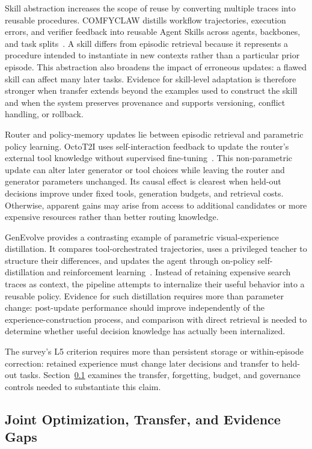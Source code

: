 Skill abstraction increases the scope of reuse by converting multiple traces into reusable procedures. COMFYCLAW distills workflow trajectories, execution errors, and verifier feedback into reusable Agent Skills across agents, backbones, and task splits~\cite{avg260701709}. A skill differs from episodic retrieval because it represents a procedure intended to instantiate in new contexts rather than a particular prior episode. This abstraction also broadens the impact of erroneous updates: a flawed skill can affect many later tasks. Evidence for skill-level adaptation is therefore stronger when transfer extends beyond the examples used to construct the skill and when the system preserves provenance and supports versioning, conflict handling, or rollback.

Router and policy-memory updates lie between episodic retrieval and parametric policy learning. OctoT2I uses self-interaction feedback to update the router's external tool knowledge without supervised fine-tuning~\cite{jiang2026octot2i}. This non-parametric update can alter later generator or tool choices while leaving the router and generator parameters unchanged. Its causal effect is clearest when held-out decisions improve under fixed tools, generation budgets, and retrieval costs. Otherwise, apparent gains may arise from access to additional candidates or more expensive resources rather than better routing knowledge.

GenEvolve provides a contrasting example of parametric visual-experience distillation. It compares tool-orchestrated trajectories, uses a privileged teacher to structure their differences, and updates the agent through on-policy self-distillation and reinforcement learning~\cite{chen2026genevolve}. Instead of retaining expensive search traces as context, the pipeline attempts to internalize their useful behavior into a reusable policy. Evidence for such distillation requires more than parameter change: post-update performance should improve independently of the experience-construction process, and comparison with direct retrieval is needed to determine whether useful decision knowledge has actually been internalized.

The survey's L5 criterion requires more than persistent storage or within-episode correction: retained experience must change later decisions and transfer to held-out tasks. Section~\ref{subsec:training-transfer} examines the transfer, forgetting, budget, and governance controls needed to substantiate this claim.

\subsection{Joint Optimization, Transfer, and Evidence Gaps}
\label{subsec:training-transfer}

